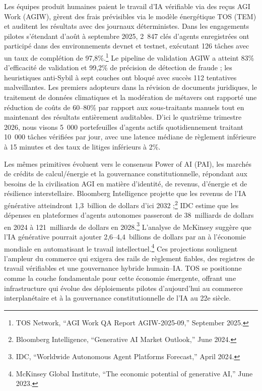 \documentclass[11pt]{article}
\begin{document}
\begin{description}[leftmargin=2.1cm, style=nextline]
  \item[12--24 mois] Les équipes produit humaines paient le travail d'IA vérifiable via des reçus AGI Work (AGIW), gèrent des frais prévisibles via le modèle énergétique TOS (TEM) et auditent les résultats avec des journaux déterministes. Dans les engagements pilotes s'étendant d'août à septembre 2025, 2~847 clés d'agents enregistrées ont participé dans des environnements devnet et testnet, exécutant 126 tâches avec un taux de complétion de 97,8\%.\footnote{TOS Network, ``AGI Work QA Report AGIW-2025-09,'' September 2025.} Le pipeline de validation AGIW a atteint 83\% d'efficacité de validation et 99,2\% de précision de détection de fraude ; les heuristiques anti-Sybil à sept couches ont bloqué avec succès 112 tentatives malveillantes. Les premiers adopteurs dans la révision de documents juridiques, le traitement de données climatiques et la modération de métavers ont rapporté une réduction de coûts de 60--80\% par rapport aux sous-traitants manuels tout en maintenant des résultats entièrement auditables. D'ici le quatrième trimestre 2026, nous visons 5~000 portefeuilles d'agents actifs quotidiennement traitant 10~000 tâches vérifiées par jour, avec une latence médiane de règlement inférieure à 15 minutes et des taux de litiges inférieurs à 2\%.

  \item[Arc centenaire] Les mêmes primitives évoluent vers le consensus Power of AI (PAI), les marchés de crédits de calcul/énergie et la gouvernance constitutionnelle, répondant aux besoins de la civilisation AGI en matière d'identité, de revenus, d'énergie et de résilience interstellaire. Bloomberg Intelligence projette que les revenus de l'IA générative atteindront 1,3~billion de dollars d'ici 2032 ;\footnote{Bloomberg Intelligence, ``Generative AI Market Outlook,'' June 2024.} IDC estime que les dépenses en plateformes d'agents autonomes passeront de 38~milliards de dollars en 2024 à 121~milliards de dollars en 2028.\footnote{IDC, ``Worldwide Autonomous Agent Platforms Forecast,'' April 2024.} L'analyse de McKinsey suggère que l'IA générative pourrait ajouter 2,6--4,4~billions de dollars par an à l'économie mondiale en automatisant le travail intellectuel.\footnote{McKinsey Global Institute, ``The economic potential of generative AI,'' June 2023.} Ces projections soulignent l'ampleur du commerce qui exigera des rails de règlement fiables, des registres de travail vérifiables et une gouvernance hybride humain--IA. TOS se positionne comme la couche fondamentale pour cette économie émergente, offrant une infrastructure qui évolue des déploiements pilotes d'aujourd'hui au commerce interplanétaire et à la gouvernance constitutionnelle de l'IA au 22e siècle.
\end{description}
\end{document}
